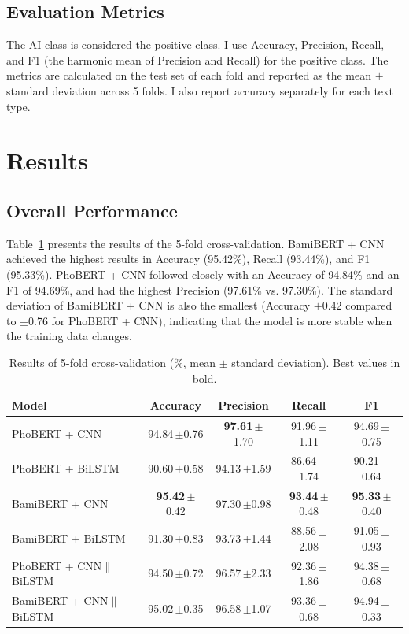 \documentclass[conference,a4paper]{IEEEtran}
\newcommand{\pmv}[2]{#1\,{\scriptsize$\pm$#2}}
\begin{document}
\subsection{Evaluation Metrics}
The AI class is considered the positive class. I use Accuracy, Precision, Recall, and F1 (the harmonic mean of Precision and Recall) for the positive class. The metrics are calculated on the test set of each fold and reported as the mean $\pm$ standard deviation across 5 folds. I also report accuracy separately for each text type.

\section{Results}
\label{sec:results}

\subsection{Overall Performance}
Table~\ref{tab:main} presents the results of the 5-fold cross-validation. BamiBERT + CNN achieved the highest results in Accuracy (95.42\%), Recall (93.44\%), and F1 (95.33\%). PhoBERT + CNN followed closely with an Accuracy of 94.84\% and an F1 of 94.69\%, and had the highest Precision (97.61\% vs. 97.30\%). The standard deviation of BamiBERT + CNN is also the smallest (Accuracy $\pm$0.42 compared to $\pm$0.76 for PhoBERT + CNN), indicating that the model is more stable when the training data changes.

\begin{table}[t]
  \centering
  \caption{Results of 5-fold cross-validation (\%, mean $\pm$ standard deviation). Best values in bold.}
  \label{tab:main}
  \setlength{\tabcolsep}{0.8pt}
  \begin{tabular}{lcccc}
    \toprule
    Model & Accuracy & Precision & Recall & F1 \\
    \midrule
    PhoBERT + CNN     & \pmv{94.84}{0.76} & \pmv{\textbf{97.61}}{1.70} & \pmv{91.96}{1.11} & \pmv{94.69}{0.75} \\
    PhoBERT + BiLSTM  & \pmv{90.60}{0.58} & \pmv{94.13}{1.59} & \pmv{86.64}{1.74} & \pmv{90.21}{0.64} \\
    BamiBERT + CNN    & \pmv{\textbf{95.42}}{0.42} & \pmv{97.30}{0.98} & \pmv{\textbf{93.44}}{0.48} & \pmv{\textbf{95.33}}{0.40} \\
    BamiBERT + BiLSTM & \pmv{91.30}{0.83} & \pmv{93.73}{1.44} & \pmv{88.56}{2.08} & \pmv{91.05}{0.93} \\
    \midrule
    {\scriptsize PhoBERT + CNN$\|$BiLSTM} & \pmv{94.50}{0.72} & \pmv{96.57}{2.33} & \pmv{92.36}{1.86} & \pmv{94.38}{0.68} \\
    {\scriptsize BamiBERT + CNN$\|$BiLSTM} & \pmv{95.02}{0.35} & \pmv{96.58}{1.07} & \pmv{93.36}{0.68} & \pmv{94.94}{0.33} \\
    \bottomrule
  \end{tabular}
\end{table}
\end{document}

